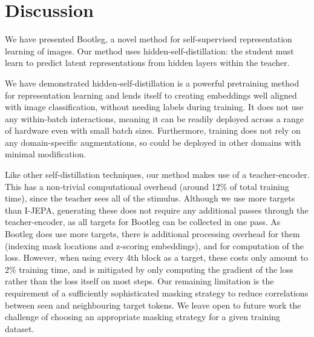 \section{Discussion}

We have presented Bootleg, a novel method for self-supervised representation learning of images.
Our method uses hidden-self-distillation: the student must learn to predict latent representations from hidden layers within the teacher.

We have demonstrated hidden-self-distillation is a powerful pretraining method for representation learning and lends itself to creating embeddings well aligned with image classification, without needing labels during training.
It does not use any within-batch interactions, meaning it can be readily deployed across a range of hardware even with small batch sizes.
Furthermore, training does not rely on any domain-specific augmentations, so could be deployed in other domains with minimal modification.

Like other self-distillation techniques, our method makes use of a teacher-encoder.
This has a non-trivial computational overhead (around 12\% of total training time), since the teacher sees all of the stimulus.
Although we use more targets than I-JEPA, generating these does not require any additional passes through the teacher-encoder, as all targets for Bootleg can be collected in one pass.
As Bootleg does use more targets, there is additional processing overhead for them (indexing mask locations and z-scoring embeddings), and for computation of the loss.
However, when using every 4th block as a target, these costs only amount to 2\% training time, and is mitigated by only computing the gradient of the loss rather than the loss itself on most steps.
Our remaining limitation is the requirement of a sufficiently sophisticated masking strategy to reduce correlations between seen and neighbouring target tokens.
We leave open to future work the challenge of choosing an appropriate masking strategy for a given training dataset.
